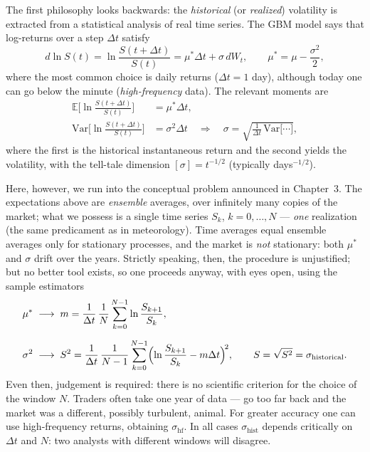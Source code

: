 The first philosophy looks backwards: the \emph{historical} (or \emph{realized}) volatility is extracted from a statistical analysis of real time series.
The GBM model says that log-returns over a step $\Delta t$ satisfy
\begin{equation}
d\ln S(t) = \ln\frac{S(t+\Delta t)}{S(t)} = \mu^*\!\Delta t + \sigma\, dW_t, \qquad \mu^* = \mu - \frac{\sigma^2}{2},
\end{equation}
where the most common choice is daily returns ($\Delta t = 1$ day), although today one can go below the minute (\emph{high-frequency} data).
The relevant moments are
\begin{align}
\mathbb{E}\!\biggl[\ln\frac{S(t+\Delta t)}{S(t)}\biggr] &= \mu^*\!\Delta t, \\[4pt]
\mathrm{Var}\!\biggl[\ln\frac{S(t+\Delta t)}{S(t)}\biggr] &= \sigma^2\Delta t
\quad\Longrightarrow\quad
\sigma = \sqrt{\frac{1}{\Delta t}\,\mathrm{Var}\!\bigl[\cdots\bigr]},
\end{align}
where the first is the historical instantaneous return and the second yields the volatility, with the tell-tale dimension $[\sigma] = t^{-1/2}$ (typically days$^{-1/2}$).

Here, however, we run into the conceptual problem announced in Chapter~3.
The expectations above are \emph{ensemble} averages, over infinitely many copies of the market; what we possess is a single time series $S_k$, $k=0,\ldots,N$ --- \emph{one} realization (the same predicament as in meteorology).
Time averages equal ensemble averages only for stationary processes, and the market is \emph{not} stationary: both $\mu^*$ and $\sigma$ drift over the years.
Strictly speaking, then, the procedure is unjustified; but no better tool exists, so one proceeds anyway, with eyes open, using the sample estimators
\begin{align}
\mu^* &\;\longrightarrow\; m = \frac{1}{\Delta t}\,\frac{1}{N}\sum_{k=0}^{N-1}\ln\frac{S_{k+1}}{S_k}, \\[6pt]
\sigma^2 &\;\longrightarrow\; S^2 = \frac{1}{\Delta t}\,\frac{1}{N-1}\sum_{k=0}^{N-1}\Bigl(\ln\frac{S_{k+1}}{S_k} - m\Delta t\Bigr)^{\!2}, \qquad S = \sqrt{S^2} = \sigma_{\text{historical}}.
\end{align}
Even then, judgement is required: there is no scientific criterion for the choice of the window $N$.
Traders often take one year of data --- go too far back and the market was a different, possibly turbulent, animal.
For greater accuracy one can use high-frequency returns, obtaining $\sigma_{\text{hf}}$.
In all cases $\sigma_{\text{hist}}$ depends critically on $\Delta t$ and $N$: two analysts with different windows will disagree.

